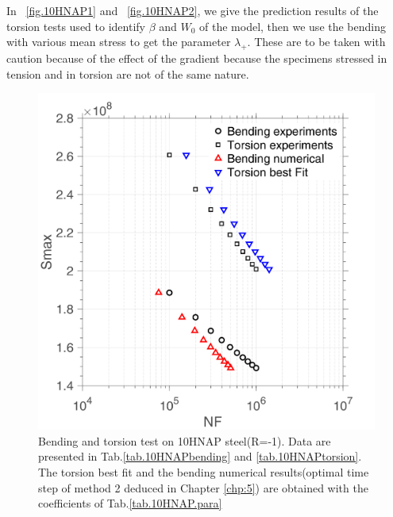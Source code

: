 \documentclass[3p,times,procedia,number]{elsarticle}
\newcommand{\figref}[1]{\figurename~\ref{#1}}
\begin{document}
In \figref{fig.10HNAP1} and \figref{fig.10HNAP2}, we give the prediction results of the torsion tests used to identify $\beta$ and $W_0$ of the model, then we use the bending with various mean stress to get the parameter $\lambda_+$. These are to be taken with caution because of the effect of the gradient because the specimens stressed in tension and in torsion are not of the same nature.
\begin{figure}[!h]
	\centering
	\includegraphics[width=\textwidth]{figures//10HNAP_bt1D_sn.png} 
	\caption{Bending and torsion test on 10HNAP steel(R=-1). Data are presented in Tab.\ref{tab.10HNAPbending} and  \ref{tab.10HNAPtorsion}. The torsion best fit and the bending numerical results(optimal time step of method 2 deduced in Chapter \ref{chp:5}) are obtained with the coefficients of Tab.\ref{tab.10HNAP.para}}
	\label{fig.bt1D10HNAPsn}
\end{figure}
\end{document}
